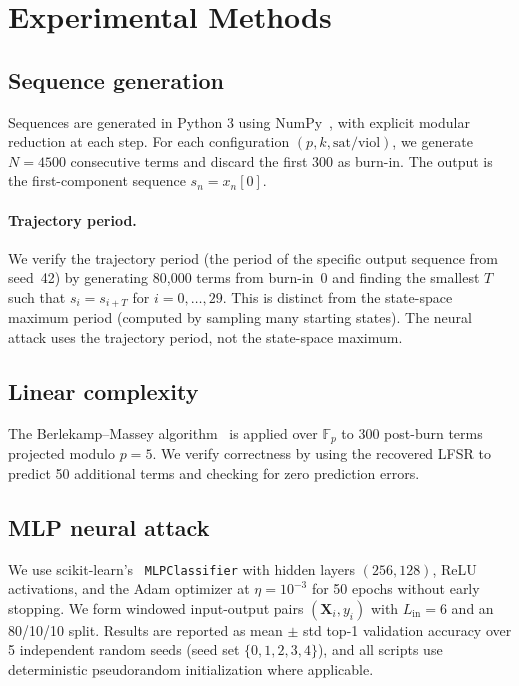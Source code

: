 \documentclass[11pt]{article}
\theoremstyle{plain}
\theoremstyle{definition}
\newcommand{\F}{\mathbb{F}}
\begin{document}
\section{Experimental Methods}
\label{sec:methods}

\subsection{Sequence generation}

Sequences are generated in Python 3 using NumPy~\citep{numpy}, with explicit modular reduction at each step. For each configuration $(p, k, \mathrm{sat/viol})$, we generate $N = 4500$ consecutive terms and discard the first 300 as burn-in. The output is the first-component sequence $s_n = x_n[0]$.

\paragraph{Trajectory period.} We verify the trajectory period (the period of the specific output sequence from seed~42) by generating 80{,}000 terms from burn-in~0 and finding the smallest $T$ such that $s_i = s_{i+T}$ for $i = 0, \ldots, 29$. This is distinct from the state-space maximum period (computed by sampling many starting states). The neural attack uses the trajectory period, not the state-space maximum.

\subsection{Linear complexity}

The Berlekamp--Massey algorithm~\citep{Massey1969} is applied over $\F_p$ to 300 post-burn terms projected modulo $p=5$. We verify correctness by using the recovered LFSR to predict 50 additional terms and checking for zero prediction errors.

\subsection{MLP neural attack}

We use scikit-learn's~\citep{sklearn} \texttt{MLPClassifier} with hidden layers $(256, 128)$, ReLU activations, and the Adam optimizer at $\eta = 10^{-3}$ for 50 epochs without early stopping. We form windowed input-output pairs $(\mathbf{X}_i, y_i)$ with $L_{\mathrm{in}} = 6$ and an 80/10/10 split. Results are reported as mean $\pm$ std top-1 validation accuracy over 5 independent random seeds (seed set $\{0,1,2,3,4\}$), and all scripts use deterministic pseudorandom initialization where applicable.
\end{document}
